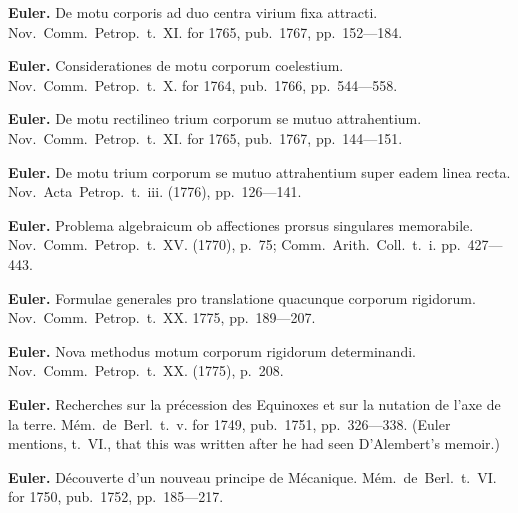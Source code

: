 \documentclass[11pt,a4paper]{book}
\begin{document}
\vspace{0.5em}

\noindent\textbf{Euler.} De motu corporis ad duo centra virium fixa attracti. Nov.~Comm.~Petrop.~t.~XI. for 1765, pub.~1767, pp.~152---184.

\vspace{0.5em}

\noindent\textbf{Euler.} Considerationes de motu corporum coelestium. Nov.~Comm.~Petrop.~t.~X. for 1764, pub.~1766, pp.~544---558.

\vspace{0.5em}

\noindent\textbf{Euler.} De motu rectilineo trium corporum se mutuo attrahentium. Nov.~Comm.~Petrop.~t.~XI. for 1765, pub.~1767, pp.~144---151.

\vspace{0.5em}

\noindent\textbf{Euler.} De motu trium corporum se mutuo attrahentium super eadem linea recta. Nov.~Acta~Petrop.~t.~iii. (1776), pp.~126---141.

\vspace{0.5em}

\noindent\textbf{Euler.} Problema algebraicum ob affectiones prorsus singulares memorabile. Nov.~Comm.~Petrop.~t.~XV. (1770), p.~75; Comm.~Arith.~Coll.~t.~i. pp.~427---443.

\vspace{0.5em}

\noindent\textbf{Euler.} Formulae generales pro translatione quacunque corporum rigidorum. Nov.~Comm.~Petrop.~t.~XX. 1775, pp.~189---207.

\vspace{0.5em}

\noindent\textbf{Euler.} Nova methodus motum corporum rigidorum determinandi. Nov.~Comm.~Petrop.~t.~XX. (1775), p.~208.

\vspace{0.5em}

\noindent\textbf{Euler.} Recherches sur la pr\'{e}cession des Equinoxes et sur la nutation de l'axe de la terre. M\'{e}m.~de~Berl.~t.~v. for 1749, pub.~1751, pp.~326---338. (Euler mentions, t.~VI., that this was written after he had seen D'Alembert's memoir.)

\vspace{0.5em}

\noindent\textbf{Euler.} D\'{e}couverte d'un nouveau principe de M\'{e}canique. M\'{e}m.~de~Berl.~t.~VI. for 1750, pub.~1752, pp.~185---217.
\end{document}
